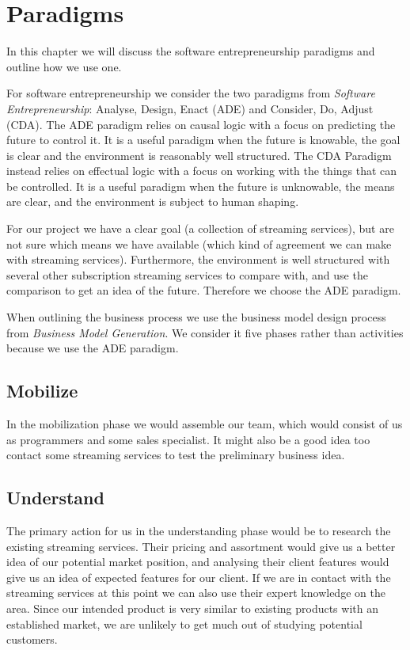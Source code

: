 \section{Paradigms}
\label{sec:paradigms}
In this chapter we will discuss the software entrepreneurship paradigms and outline how we use one.

For software entrepreneurship we consider the two paradigms from \textit{Software	Entrepreneurship}\cite[p. 27-39]{Software_entrepreneurship}: Analyse, Design, Enact (ADE) and Consider, Do, Adjust (CDA).
The ADE paradigm relies on causal logic with a focus on predicting the future to control it.
It is a useful paradigm when the future is knowable, the goal is clear and the environment is reasonably well structured.
The CDA Paradigm instead relies on effectual logic with a focus on working with the things that can be controlled.
It is a useful paradigm when the future is unknowable, the means are clear, and the environment is subject to human shaping.

For our project we have a clear goal (a collection of streaming services), but are not sure which means we have available (which kind of agreement we can make with streaming services).
Furthermore, the environment is well structured with several other subscription streaming services to compare with, and use the comparison to get an idea of the future.
Therefore we choose the ADE paradigm.

When outlining the business process we use the business model design process from \textit{Business Model Generation}\cite[p. 244-261]{canvas}.%
We consider it five phases rather than activities because we use the ADE paradigm.

\subsection{Mobilize}
In the mobilization phase we would assemble our team, which would consist of us as programmers and some sales specialist. It might also be a good idea too contact some streaming services to test the preliminary business idea.

\subsection{Understand}
The primary action for us in the understanding phase would be to research the existing streaming services. Their pricing and assortment would give us a better idea of our potential market position, and analysing their client features would give us an idea of expected features for our client.
If we are in contact with the streaming services at this point we can also use their expert knowledge on the area.
Since our intended product is very similar to existing products with an established market, we are unlikely to get much out of studying potential customers.

